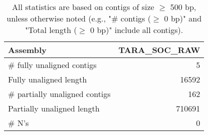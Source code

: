 \documentclass[12pt,a4paper]{article}
\begin{document}
\begin{table}[ht]
\begin{center}
\caption{All statistics are based on contigs of size $\geq$ 500 bp, unless otherwise noted (e.g., "\# contigs ($\geq$ 0 bp)" and "Total length ($\geq$ 0 bp)" include all contigs).}
\begin{tabular}{|l*{1}{|r}|}
\hline
Assembly & TARA\_SOC\_RAW \\ \hline
\# fully unaligned contigs & 5 \\ \hline
Fully unaligned length & 16592 \\ \hline
\# partially unaligned contigs & 162 \\ \hline
Partially unaligned length & 710691 \\ \hline
\# N's & 0 \\ \hline
\end{tabular}
\end{center}
\end{table}
\end{document}
